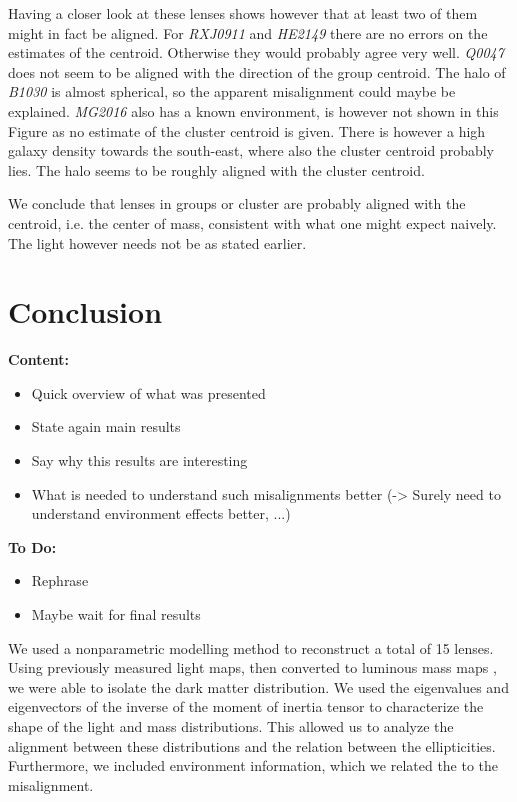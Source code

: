 \documentclass[useAMS,usenatbib]{mn2e}
\begin{document}
Having a closer look at these lenses shows however that at least two of them might in fact be aligned. For \textit{RXJ0911} and \textit{HE2149} there are no errors on the estimates of the centroid. Otherwise they would probably agree very well. \textit{Q0047} does not seem to be aligned with the direction of the group centroid. The halo of \textit{B1030} is almost spherical, so the apparent misalignment could maybe be explained. \textit{MG2016} also has a known environment, is however not shown in this Figure as no estimate of the cluster centroid is given. There is however a high galaxy density towards the south-east, where also the cluster centroid probably lies. The halo seems to be roughly aligned with the cluster centroid. %

We conclude that lenses in groups or cluster are probably aligned with the centroid, i.e. the center of mass, consistent with what one might expect naively. The light however needs not be as stated earlier.



\section{Conclusion}\label{sec:conclusion}
\textbf{Content:}
\begin{itemize}
\item Quick overview of what was presented
\item State again main results
\item Say why this results are interesting
\item What is needed to understand such misalignments better (-> Surely need to understand environment effects better, ...)
\end{itemize}

\textbf{To Do:}
\begin{itemize}
\item Rephrase
\item Maybe wait for final results
\end{itemize}

We used a nonparametric modelling method to reconstruct a total of 15 lenses. Using previously measured light maps, then converted to luminous mass maps \cite{leier11phd}, we were able to isolate the dark matter distribution. We used the eigenvalues and eigenvectors of the inverse of the moment of inertia tensor to characterize the shape of the light and mass distributions. This allowed us to analyze the alignment between these distributions and the relation between the ellipticities. Furthermore, we included environment information, which we related the to the misalignment.
\end{document}
